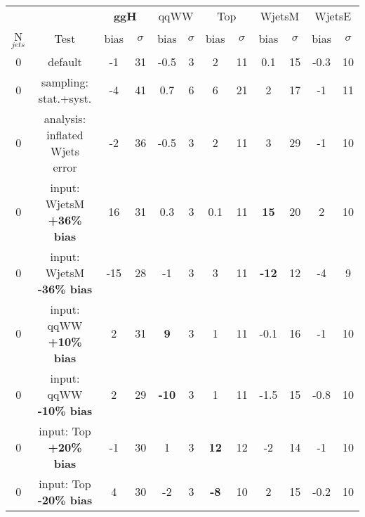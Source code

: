 
\begin{table}
\begin{center}
\begin{tabular}{c | c  | c c | c c | c c | c c | c c }
\hline
\hline
          &      & \multicolumn{2}{c|}{{\bf ggH}} & \multicolumn{2}{c|}{qqWW} & \multicolumn{2}{c|}{Top} & \multicolumn{2}{c}{WjetsM} & \multicolumn{2}{c}{WjetsE} \\ 
N$_{jets}$ & Test & bias & $\sigma$ & bias & $\sigma$ & bias & $\sigma$ & bias & $\sigma$ & bias & $\sigma$ \\
\hline
0 & default                             &  -1 & 31 &-0.5 & 3 &  2  & 11 & 0.1 & 15 &-0.3 & 10 \\
0 & sampling: stat.+syst.               &  -4 & 41 & 0.7 & 6 &  6  & 21 &  2  & 17 & -1  & 11 \\
\hline
0 & analysis: inflated Wjets error      &  -2 & 36 & -0.5 & 3 &  2  & 11 &  3        & 29 & -1   & 10 \\
0 & input: WjetsM {\bf +36\% bias}      &  16 & 31 & 0.3  & 3 & 0.1 & 11 & {\bf 15}  & 20 & 2    & 10 \\
0 & input: WjetsM {\bf -36\% bias}      & -15 & 28 & -1   & 3 & 3   & 11 & {\bf -12} & 12 & -4   & 9 \\
\hline
0 & input: qqWW {\bf +10\% bias}        & 2 & 31 & {\bf 9}   & 3 & 1 & 11 & -0.1 & 16 & -1   & 10 \\
0 & input: qqWW {\bf -10\% bias}        & 2 & 29 & {\bf -10} & 3 & 1 & 11 & -1.5 & 15 & -0.8 & 10 \\
\hline
0 & input: Top {\bf +20\% bias}         & -1  & 30  & 1    & 3 & {\bf 12} & 12  & -2 & 14  & -1   & 10\\
0 & input: Top {\bf -20\% bias}         & 4   & 30  & -2   & 3 & {\bf -8} & 10  & 2  & 15  & -0.2 & 10\\

\end{tabular}
\end{center}
\end{table}
